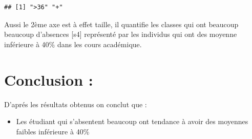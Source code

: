 \documentclass[
]{article}
\providecommand{\tightlist}{%
  \setlength{\itemsep}{0pt}\setlength{\parskip}{0pt}}
\begin{document}
\begin{verbatim}
## [1] ">36" "+"
\end{verbatim}

Aussi le 2ème axe est à effet taille, il quantifie les classes qui ont
beaucoup beaucoup d'absences {[}s4{]} représenté par les individus qui
ont des moyenne inférieure à 40\% dans les cours académique.

\hypertarget{conclusion}{%
\section{Conclusion :}\label{conclusion}}

D'aprés les résultats obtenus on conclut que :

\begin{itemize}
\tightlist
\item
  Les étudiant qui s'absentent beaucoup ont tendance à avoir des
  moyennes faibles inférieure à 40\%
\end{itemize}
\end{document}
